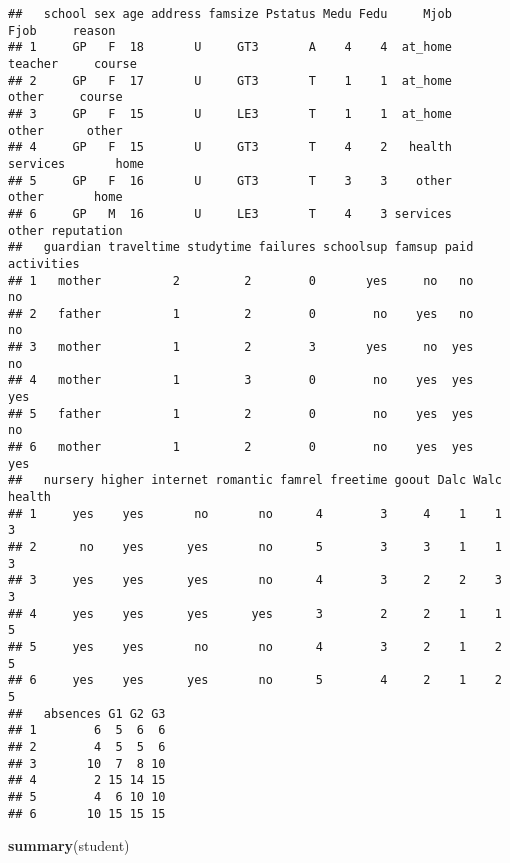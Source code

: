 \documentclass[
]{article}
\newenvironment{Shaded}{\begin{snugshade}}{\end{snugshade}}
\newcommand{\FunctionTok}[1]{\textcolor[rgb]{0.13,0.29,0.53}{\textbf{#1}}}
\newcommand{\NormalTok}[1]{#1}
\begin{document}
\begin{verbatim}
##   school sex age address famsize Pstatus Medu Fedu     Mjob     Fjob     reason
## 1     GP   F  18       U     GT3       A    4    4  at_home  teacher     course
## 2     GP   F  17       U     GT3       T    1    1  at_home    other     course
## 3     GP   F  15       U     LE3       T    1    1  at_home    other      other
## 4     GP   F  15       U     GT3       T    4    2   health services       home
## 5     GP   F  16       U     GT3       T    3    3    other    other       home
## 6     GP   M  16       U     LE3       T    4    3 services    other reputation
##   guardian traveltime studytime failures schoolsup famsup paid activities
## 1   mother          2         2        0       yes     no   no         no
## 2   father          1         2        0        no    yes   no         no
## 3   mother          1         2        3       yes     no  yes         no
## 4   mother          1         3        0        no    yes  yes        yes
## 5   father          1         2        0        no    yes  yes         no
## 6   mother          1         2        0        no    yes  yes        yes
##   nursery higher internet romantic famrel freetime goout Dalc Walc health
## 1     yes    yes       no       no      4        3     4    1    1      3
## 2      no    yes      yes       no      5        3     3    1    1      3
## 3     yes    yes      yes       no      4        3     2    2    3      3
## 4     yes    yes      yes      yes      3        2     2    1    1      5
## 5     yes    yes       no       no      4        3     2    1    2      5
## 6     yes    yes      yes       no      5        4     2    1    2      5
##   absences G1 G2 G3
## 1        6  5  6  6
## 2        4  5  5  6
## 3       10  7  8 10
## 4        2 15 14 15
## 5        4  6 10 10
## 6       10 15 15 15
\end{verbatim}

\begin{Shaded}
\begin{Highlighting}[]
\FunctionTok{summary}\NormalTok{(student)}
\end{Highlighting}
\end{Shaded}
\end{document}
